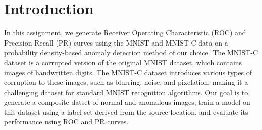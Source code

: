 \section{Introduction}
In this assignment, we generate Receiver Operating Characteristic (ROC) and Precision-Recall (PR) curves using the MNIST and MNIST-C data on a probability density-based anomaly detection method of our choice. 
The MNIST-C dataset is a corrupted version of the original MNIST dataset, which contains images of handwritten digits. 
The MNIST-C dataset introduces various types of corruption to these images, such as blurring, noise, and pixelation, making it a challenging dataset for standard MNIST recognition algorithms.
Our goal is to generate a composite datset of normal and anomalous images, train a model on this dataset using a label set derived from the source location, and evaluate its performance using ROC and PR curves.


